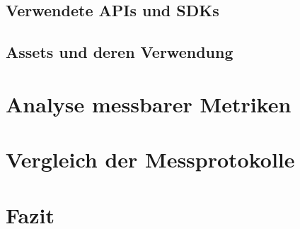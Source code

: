 \section{Verwendete APIs und SDKs}
\section{Assets und deren Verwendung}

\chapter{Analyse messbarer Metriken}

\chapter{Vergleich der Messprotokolle}

\chapter{Fazit}




\listoffigures %

\begin{thebibliography}{}
\end{thebibliography}
\clearpage\thispagestyle{empty}
\eigen  %
